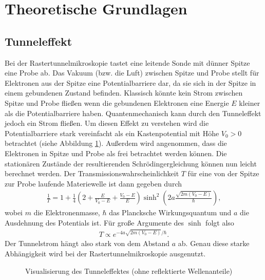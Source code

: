 \section{Theoretische Grundlagen}

\subsection{Tunneleffekt}
Bei der Rastertunnelmikroskopie tastet eine leitende Sonde mit dünner Spitze eine Probe ab. Das Vakuum (bzw. die Luft) zwischen Spitze und Probe stellt für Elektronen aus der Spitze eine Potentialbarriere dar, da sie sich in der Spitze in einem gebundenen Zustand befinden. Klassisch könnte kein Strom zwischen Spitze und Probe fließen wenn die gebundenen Elektronen eine Energie $E$ kleiner als die Potentialbarriere haben. Quantenmechanisch kann durch den Tunneleffekt jedoch ein Strom fließen. Um diesen Effekt zu verstehen wird die Potentialbarriere stark vereinfacht als ein Kastenpotential mit Höhe $V_0>0$ betrachtet (siehe Abbildung \ref{fig:tunnel}). Außerdem wird angenommen, dass die Elektronen in Spitze und Probe als frei betrachtet werden können. Die stationären Zustände der resultierenden Schrödingergleichung können nun leicht berechnet werden. Der Transmissionswahrscheinlichkeit $T$ für eine von der Spitze zur Probe laufende Materiewelle ist dann gegeben durch
\begin{align*}
  \frac{1}{T}=1+\frac{1}{4}\left( 2+\frac{E}{V_0-E} + \frac{V_0-E}{E}\right) \sinh^2\left( 2a \frac{\sqrt{2m(V_0-E)}}{\hbar} \right), 
\end{align*}
wobei $m$ die Elektronenmasse, $\hbar$ das Plancksche Wirkungsquantum und $a$ die Ausdehnung des Potentials ist.
Für große Argumente des $\sinh$ folgt also
\begin{align}
  T \propto e^{-4a\sqrt{2m(V_0-E)}/\hbar}.
  \label{eq:T}
\end{align}  
Der Tunnelstrom hängt also stark von dem Abstand $a$ ab. Genau diese starke Abhängigkeit wird bei der Rastertunnelmikroskopie ausgenutzt. 


\begin{figure}[h]
  \centering
  \caption{Visualisierung des Tunneleffektes (ohne reflektierte Wellenanteile)}
  \label{fig:tunnel}
\end{figure}

